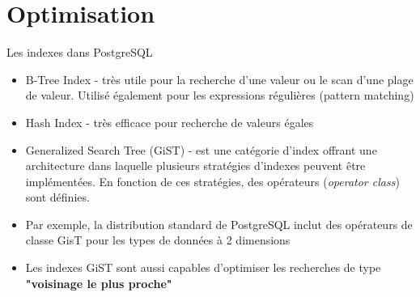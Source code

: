 
\section{Optimisation}


\begin{frame}[fragile]{Les indexes dans PostgreSQL}


   \begin{itemize}
      \item B-Tree Index - très utile pour la recherche d'une valeur ou le scan d'une plage de valeur. Utilisé également pour les expressions régulières (pattern matching)
      \item Hash Index - très efficace pour recherche de valeurs égales
      \item Generalized Search Tree (GiST) - est une catégorie d'index offrant une architecture dans laquelle plusieurs stratégies d'indexes peuvent être implémentées. En fonction de ces stratégies, des opérateurs (\textit{operator class}) sont définies.
      \item Par exemple, la distribution standard de PostgreSQL inclut des opérateurs de classe GisT pour les types de données à 2 dimensions
      \item Les indexes GiST sont aussi capables d'optimiser les recherches de type \textbf{"voisinage le plus proche"}
   \end{itemize}

\begin{toile}
\end{toile}

\end{frame}


